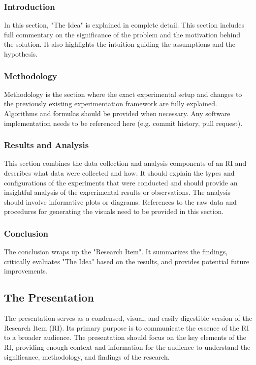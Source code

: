 \documentclass{article}
\begin{document}
\subsubsection{Introduction}
In this section, "The Idea" is explained in complete detail. This section includes full commentary on the significance of the problem and the motivation behind the solution. It also highlights the intuition guiding the assumptions and the hypothesis.

\subsubsection{Methodology}
Methodology is the section where the exact experimental setup and changes to the previously existing experimentation framework are fully explained. Algorithms and formulas should be provided when necessary. Any software implementation needs to be referenced here (e.g. commit history, pull request).

\subsubsection{Results and Analysis}
This section combines the data collection and analysis components of an RI and describes what data were collected and how. It should explain the types and configurations of the experiments that were conducted and should provide an insightful analysis of the experimental results or observations. The analysis should involve informative plots or diagrams. References to the raw data and procedures for generating the visuals need to be provided in this section.

\subsubsection{Conclusion}
The conclusion wraps up the "Research Item". It summarizes the findings, critically evaluates "The Idea" based on the results, and provides potential future improvements.

\subsection{The Presentation}
The presentation serves as a condensed, visual, and easily digestible version of the Research Item (RI). Its primary purpose is to communicate the essence of the RI to a broader audience. The presentation should focus on the key elements of the RI, providing enough context and information for the audience to understand the significance, methodology, and findings of the research.
\end{document}
